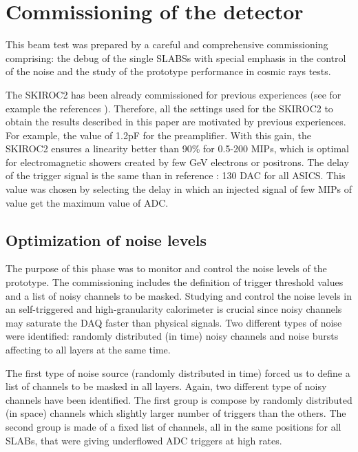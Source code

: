 \documentclass[a4paper,11pt]{article}
\begin{document}
\section{Commissioning of the detector}
\label{sec:commissioning}

This beam test was prepared by a careful and comprehensive commissioning comprising:
the debug of the
single SLABSs with special emphasis in the control of the noise and the study of the
prototype performance in cosmic rays tests.

The SKIROC2 has been already commissioned for previous experiences (see for example the 
references \cite{Amjad:2014tha,Suehara:2018mqk}). 
Therefore, all the settings used for the SKIROC2 to obtain 
the results described in this paper are motivated by previous experiences. 
For example, the value of 1.2pF for the preamplifier. 
With this gain, the SKIROC2 ensures a linearity better than 90\% 
for 0.5-200 MIPs, which is optimal for 
electromagnetic showers created by few GeV 
electrons or positrons. The delay of the trigger signal is the same than in 
reference \cite{Amjad:2014tha,Suehara:2018mqk}: 130 DAC for all ASICS. 
This value was chosen by selecting the delay in which an injected signal
of few MIPs of value get the maximum value of ADC. %


\subsection{Optimization of noise levels}
\label{sec:comm_noise}

The purpose of this phase was to monitor and control the
noise levels of the prototype. The commissioning includes the definition of trigger threshold values and a list of noisy channels to be masked.
Studying and control the noise levels in an self-triggered and high-granularity calorimeter
is crucial since noisy channels may saturate the DAQ faster than physical signals.
Two different types of noise were identified:
randomly distributed (in time) noisy channels 
and noise bursts affecting to all layers at the same time.

The first type of noise source (randomly distributed in time)
forced us to define a list of channels to be masked in all 
layers. Again, two different type of noisy channels have been identified. 
The first group is compose by randomly distributed (in space) channels which 
slightly larger number of triggers than the others. The second group is made of
a fixed list of channels, all in the same positions for all SLABs, that were giving
underflowed ADC triggers at high rates. 
\end{document}
